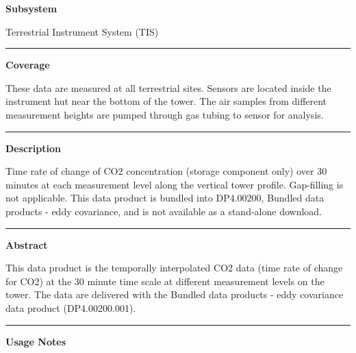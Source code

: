 \documentclass[]{article}
\begin{document}
\textbf{Subsystem}

Terrestrial Instrument System (TIS)

\begin{center}\rule{0.5\linewidth}{\linethickness}\end{center}

\textbf{Coverage}

These data are measured at all terrestrial sites. Sensors are located
inside the instrument hut near the bottom of the tower. The air samples
from different measurement heights are pumped through gas tubing to
sensor for analysis.

\begin{center}\rule{0.5\linewidth}{\linethickness}\end{center}

\textbf{Description}

Time rate of change of CO2 concentration (storage component only) over
30 minutes at each measurement level along the vertical tower profile.
Gap-filling is not applicable. This data product is bundled into
DP4.00200, Bundled data products - eddy covariance, and is not available
as a stand-alone download.

\begin{center}\rule{0.5\linewidth}{\linethickness}\end{center}

\textbf{Abstract}

This data product is the temporally interpolated CO2 data (time rate of
change for CO2) at the 30 minute time scale at different measurement
levels on the tower. The data are delivered with the Bundled data
products - eddy covariance data product (DP4.00200.001).

\begin{center}\rule{0.5\linewidth}{\linethickness}\end{center}

\textbf{Usage Notes}
\end{document}
